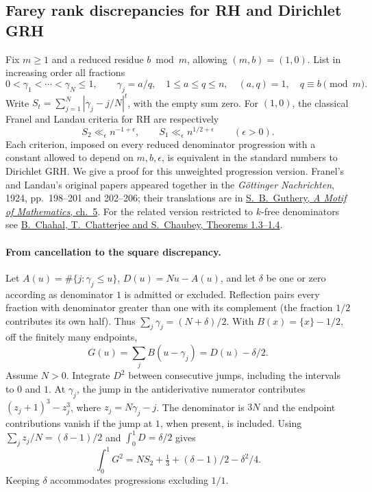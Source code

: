 \subsection{Farey rank discrepancies for RH and Dirichlet GRH}\label{sec:fareyrank}
Fix \(m\ge1\) and a reduced residue \(b\bmod m\), allowing \((m,b)=(1,0)\). List in increasing order all fractions
\[
 0<\gamma_1<\cdots<\gamma_N\le1,\qquad
 \gamma_j=a/q,\quad 1\le a\le q\le n,\quad (a,q)=1,\quad q\equiv b\pmod m.
\]
Write \(S_t=\sum_{j=1}^N |\gamma_j-j/N|^t\), with the empty sum zero. For \((1,0)\), the classical Franel and Landau criteria for RH are respectively
\[
 S_2\ll_{\epsilon} n^{-1+\epsilon},\qquad
 S_1\ll_{\epsilon} n^{1/2+\epsilon}\qquad(\epsilon>0).
\]
Each criterion, imposed on every reduced denominator progression with a constant allowed to depend on \(m,b,\epsilon\), is equivalent in the standard numbers to Dirichlet GRH. We give a proof for this unweighted progression version. Franel's and Landau's original papers appeared together in the \emph{G\"ottinger Nachrichten}, 1924, pp.~198--201 and 202--206; their translations are in \href{https://webhomes.maths.ed.ac.uk/~v1ranick/papers/farey.pdf}{S.~B.~Guthery, \emph{A Motif of Mathematics}, ch.~5}. For the related version restricted to \(k\)-free denominators see \href{https://arxiv.org/abs/2507.00228}{B.~Chahal, T.~Chatterjee and S.~Chaubey, Theorems 1.3--1.4}.

\paragraph{From cancellation to the square discrepancy.}
Let \(A(u)=\#\{j:\gamma_j\le u\}\), \(D(u)=Nu-A(u)\), and let \(\delta\) be one or zero according as denominator \(1\) is admitted or excluded. Reflection pairs every fraction with denominator greater than one with its complement (the fraction \(1/2\) contributes its own half). Thus \(\sum_j\gamma_j=(N+\delta)/2\). With \(B(x)=\{x\}-1/2\), off the finitely many endpoints,
\[
 G(u)=\sum_j B(u-\gamma_j)=D(u)-\delta/2 .
\]
Assume \(N>0\). Integrate \(D^2\) between consecutive jumps, including the intervals to \(0\) and \(1\). At \(\gamma_j\), the jump in the antiderivative numerator contributes
\((z_j+1)^3-z_j^3\), where \(z_j=N\gamma_j-j\). The denominator is \(3N\) and the endpoint contributions vanish if the jump at \(1\), when present, is included. Using \(\sum_j z_j/N=(\delta-1)/2\) and \(\int_0^1D=\delta/2\) gives
\[
 \int_0^1G^2=N S_2 + \tfrac13+(\delta-1)/2-\delta^2/4 .
\]
Keeping \(\delta\) accommodates progressions excluding \(1/1\).


